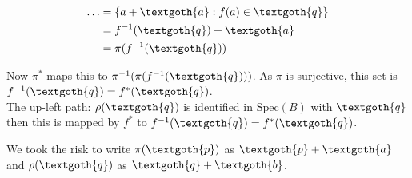 \documentclass{article}
\begin{document}
\begin{equation*}
\begin{split}
  \dots & = \{ a + \textgoth{a}: f(a) \in \textgoth{q} \} \\
        & = f^{-1}(\textgoth{q}) + \textgoth{a} \\ 
        & = \pi(f^{-1}(\textgoth{q}))
\end{split}
\end{equation*}

\noindent
Now $\pi^*$ maps this to $\pi^{-1}(\pi(f^{-1}(\textgoth{q})))$. As $\pi$ is surjective, this set is $f^{-1}(\textgoth{q}) = f^*(\textgoth{q})$. \\
The up-left path: $\rho(\textgoth{q})$ is identified in $\text{Spec}(B)$ with $\textgoth{q}$ then this is mapped by $f^*$ to $f^{-1}(\textgoth{q}) = f^*(\textgoth{q})$. 


\noindent
We took the risk to write $\pi(\textgoth{p})$ as $\textgoth{p} + \textgoth{a}$ and $\rho(\textgoth{q})$ as $\textgoth{q} + \textgoth{b}$.
\end{document}
